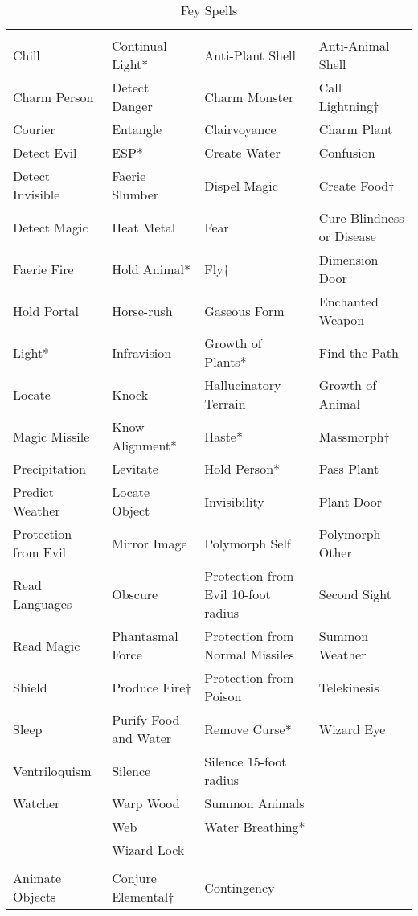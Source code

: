 \begin {table}[H]
  \caption{Fey Spells}
  \begin{tabularx}{\columnwidth}{YYYY}
	 &  &  & \\
	Chill & Continual Light* & Anti-Plant Shell & Anti-Animal Shell\\
	Charm Person & Detect Danger & Charm Monster & Call Lightning†\\
	Courier & Entangle & Clairvoyance & Charm Plant\\
	Detect Evil & ESP* & Create Water & Confusion\\
	Detect Invisible & Faerie Slumber & Dispel Magic & Create Food†\\
	Detect Magic & Heat Metal & Fear & Cure Blindness or Disease\\
	Faerie Fire & Hold Animal* & Fly† & Dimension Door\\
	Hold Portal & Horse-rush & Gaseous Form & Enchanted Weapon\\
	Light* & Infravision & Growth of Plants* & Find the Path\\
	Locate & Knock & Hallucinatory Terrain & Growth of Animal\\
	Magic Missile & Know Alignment* & Haste* & Massmorph†\\
	Precipitation & Levitate & Hold Person* & Pass Plant\\
	Predict Weather & Locate Object & Invisibility & Plant Door\\
	Protection from Evil & Mirror Image & Polymorph Self & Polymorph Other\\
	Read Languages & Obscure & Protection from Evil 10-foot radius & Second Sight\\
	Read Magic & Phantasmal Force & Protection from Normal Missiles & Summon Weather\\
	Shield & Produce Fire† & Protection from Poison & Telekinesis\\
	Sleep & Purify Food and Water & Remove Curse* & Wizard Eye\\
	Ventriloquism & Silence & Silence 15-foot radius &\\
	Watcher & Warp Wood & Summon Animals &\\
	& Web & Water Breathing* &\\
	& Wizard Lock &  &\\
	 &  & \\
	Animate Objects & Conjure Elemental† & Contingency\\

\end{tabularx}
\end{table}

